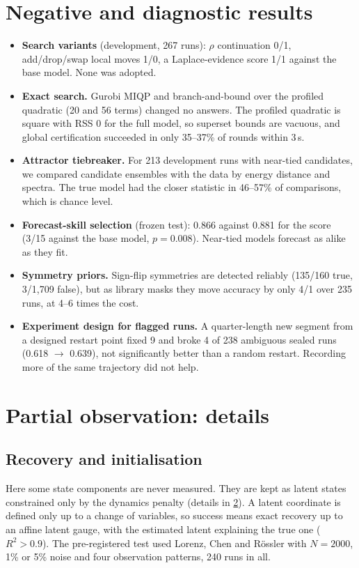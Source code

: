\section{Negative and diagnostic results}
\label{app:negative}
\begin{itemize}[leftmargin=*,itemsep=2pt]
\item \textbf{Search variants} (development, 267 runs): $\rho$ continuation 0/1, add/drop/swap local moves 1/0, a Laplace-evidence score 1/1 against the base model. None was adopted.
\item \textbf{Exact search.} Gurobi MIQP and branch-and-bound over the profiled quadratic (20 and 56 terms) changed no answers. The profiled quadratic is square with RSS 0 for the full model, so superset bounds are vacuous, and global certification succeeded in only 35--37\% of rounds within 3\,s.
\item \textbf{Attractor tiebreaker.} For 213 development runs with near-tied candidates, we compared candidate ensembles with the data by energy distance and spectra. The true model had the closer statistic in 46--57\% of comparisons, which is chance level.
\item \textbf{Forecast-skill selection} (frozen test): 0.866 against 0.881 for the score (3/15 against the base model, $p=0.008$). Near-tied models forecast as alike as they fit.
\item \textbf{Symmetry priors.} Sign-flip symmetries are detected reliably (135/160 true, 3/1{,}709 false), but as library masks they move accuracy by only 4/1 over 235 runs, at 4--6 times the cost.
\item \textbf{Experiment design for flagged runs.} A quarter-length new segment from a designed restart point fixed 9 and broke 4 of 238 ambiguous sealed runs (0.618 $\to$ 0.639), not significantly better than a random restart. Recording more of the same trajectory did not help.
\end{itemize}

\section{Partial observation: details}
\label{app:partial}

\subsection{Recovery and initialisation}
\label{sec:partial}
Here some state components are never measured. They are kept as latent states constrained only by the dynamics penalty (details in \cref{app:partial}). A latent coordinate is defined only up to a change of variables, so success means exact recovery up to an affine latent gauge, with the estimated latent explaining the true one ($R^2>0.9$). The pre-registered test used Lorenz, Chen and R\"ossler with $N=2000$, 1\% or 5\% noise and four observation patterns, 240 runs in all.


